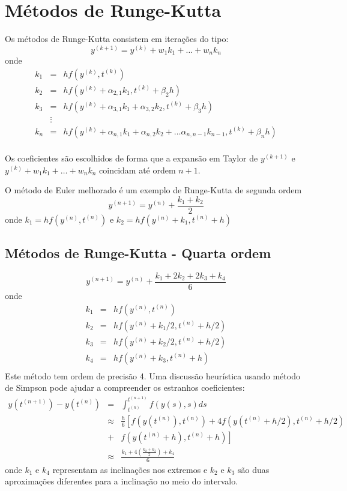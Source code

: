 \section{Métodos de Runge-Kutta}\label{sec_RK}

Os métodos de Runge-Kutta consistem em iterações do tipo:
$$y^{(k+1)}=y^{(k)}+w_1 k_1 + \ldots + w_n k_n$$
onde
\begin{eqnarray*}
k_1&=&hf(y^{(k)},t^{(k)})\\
k_2&=&hf(y^{(k)}+\alpha_{2,1}k_1,t^{(k)}+\beta_{2}h)\\
k_3&=&hf(y^{(k)}+\alpha_{3,1}k_1+\alpha_{3,2}k_2,t^{(k)}+\beta_{3}h)\\
&\vdots&\\
k_n&=&hf(y^{(k)}+\alpha_{n,1}k_1+\alpha_{n,2}k_2+\ldots \alpha_{n,n-1}k_{n-1},t^{(k)}+\beta_{n}h)\\
\end{eqnarray*}

Os coeficientes são escolhidos de forma que a expansão em Taylor de $y^{(k+1)}$ e $y^{(k)}+w_1 k_1 + \ldots + w_n k_n$ coincidam até ordem $n+1$.

\begin{ex} O método de Euler melhorado é um exemplo de Runge-Kutta de segunda ordem
$$y^{(n+1)}=y^{(n)}+\frac{k_1+k_2}{2}$$
onde $k_1=hf(y^{(n)},t^{(n)})$ e $k_2=hf(y^{(n)}+k_1,t^{(n)}+h)$
\end{ex}

\subsection{Métodos de Runge-Kutta - Quarta ordem}

$$y^{(n+1)}=y^{(n)}+\frac{k_1+2k_2+2k_3+k_4}{6}$$
onde
\begin{eqnarray*}
k_1&=&hf(y^{(n)},t^{(n)})\\
k_2&=&hf(y^{(n)}+k_1/2,t^{(n)}+h/2)\\
k_3&=&hf(y^{(n)}+k_2/2,t^{(n)}+h/2)\\
k_4&=&hf(y^{(n)}+k_3,t^{(n)}+h)\\
\end{eqnarray*}
Este método tem ordem de precisão 4. Uma discussão heurística usando método de Simpson pode ajudar a compreender os estranhos coeficientes:
\begin{eqnarray*}
y({t^{(n+1)}})-y({t^{(n)}})&=&\int_{t^{(n)}}^{t^{(n+1)}}f(y(s),s)ds \\
&\approx& \frac{h}{6}\left[ f\left(y(t^{(n)}),t^{(n)}\right)+4f\left(y(t^{(n)}+h/2),t^{(n)}+h/2\right)\right.\\
&+&\left.f\left(y(t^{(n)}+h),t^{(n)}+h\right)\right]\\
&\approx& \frac{k_1+4(\frac{k_2+k_3}{2})+k_4}{6}
\end{eqnarray*}
onde $k_1$ e $k_4$ representam as inclinações nos extremos e $k_2$ e $k_3$ são duas aproximações diferentes para a inclinação no meio do intervalo.


